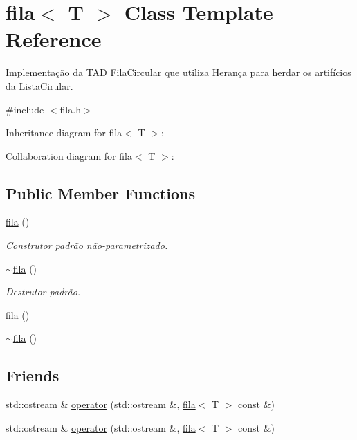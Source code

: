 \hypertarget{classfila}{\section{fila$<$ T $>$ Class Template Reference}
\label{classfila}
}


Implementação da T\-A\-D Fila\-Circular que utiliza Herança para herdar os artifícios da Lista\-Cirular.  




{\ttfamily \#include $<$fila.\-h$>$}



Inheritance diagram for fila$<$ T $>$\-:


Collaboration diagram for fila$<$ T $>$\-:
\subsection*{Public Member Functions}
\begin{DoxyCompactItemize}
\item 
\hyperlink{classfila_a3de0e8cec2c8d5cb805a69f80d1adab7}{fila} ()
\begin{DoxyCompactList}\small\item\em Construtor padrão não-\/parametrizado. \end{DoxyCompactList}\item 
\hyperlink{classfila_a2836749b9d2128ae465065afe4a8d71e}{$\sim$fila} ()
\begin{DoxyCompactList}\small\item\em Destrutor padrão. \end{DoxyCompactList}\item 
\hyperlink{classfila_a3de0e8cec2c8d5cb805a69f80d1adab7}{fila} ()
\item 
\hyperlink{classfila_a2836749b9d2128ae465065afe4a8d71e}{$\sim$fila} ()
\end{DoxyCompactItemize}
\subsection*{Friends}
\begin{DoxyCompactItemize}
\item 
std\-::ostream \& \hyperlink{classfila_a16804deb7a3840ade8bf1d6d27850254}{operator} (std\-::ostream \&, \hyperlink{classfila}{fila}$<$ T $>$ const \&)
\item 
std\-::ostream \& \hyperlink{classfila_a16804deb7a3840ade8bf1d6d27850254}{operator} (std\-::ostream \&, \hyperlink{classfila}{fila}$<$ T $>$ const \&)
\end{DoxyCompactItemize}
